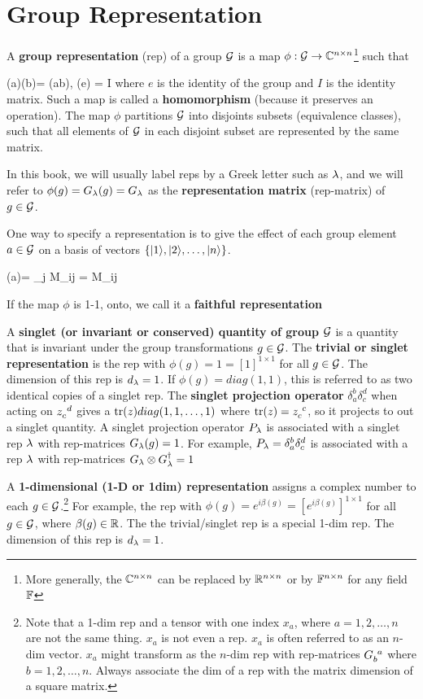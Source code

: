 \section{Group  Representation}

A {\bf group representation} (rep)
of a group ${\cal G}$
is a map $\phi: {\cal G}\rightarrow { \mathbb{C}}^{n\times n}$\footnote{More generally, the ${ \mathbb{C}}^{n\times n}$ can be replaced by ${ \mathbb{R}}^{n\times n}$ or by ${ \mathbb{F}}^{n\times n}$ for any field ${ \mathbb{F}}$} such that

\beq
\phi(a)\phi(b)=
\phi(ab),
\quad \phi(e) = I
\eeq
where $e$ is the
identity of the group
and $I$ 
is the identity matrix.
Such a map is called a {\bf homomorphism}
(because it preserves an operation).
The map $\phi$ 
partitions ${\cal G}$
into disjoints subsets (equivalence classes),
such that all elements of ${\cal G}$ in each disjoint subset 
are represented by the same matrix.

In this book, 
we will usually
label reps by a 
Greek letter
such as $\lambda$,
and we will refer to
$\phi(g)=G_\lambda(g)=G_\lambda$ as the
{\bf representation matrix} (rep-matrix) of $g\in{\cal G}$.

One  way to specify a representation is
to give the effect of each group element $a\in {\cal G}$ on a basis of vectors $\{|1\rangle, |2\rangle, \dots, |n\rangle\}$.


\beq
\phi (a)= \sum_j M_{ij}
\implies {} = M_{ij}
\eeq

If the map $\phi$
is 1-1, onto, we call it a {\bf faithful representation} 

A {\bf singlet (or invariant or conserved) quantity of group ${\cal G}$}
is a quantity that
is invariant under the group transformations
$g\in {\cal G}$.
The {\bf trivial or singlet representation}
is the rep with  $\phi(g)=1=[1]^{1\times 1}$ 
for all $g\in {\cal G}$.
The dimension 
of this rep is $d_\lambda=1$.
If $\phi(g)=diag(1,1)$,
this is referred to as two identical copies of a singlet rep.
The {\bf singlet projection operator}
$\delta_a^b \delta_c^d$
when acting on $z\indices{_c^d}$
gives a $ {\rm tr }(z) diag(1,1, \dots, 1)$
where $\tr(z)=z\indices{_c^c}$, so it
projects to out a singlet
quantity.
A singlet projection
operator $P_\lambda$ 
is associated with a singlet rep $\lambda$ with
rep-matrices $G_\lambda(g)=1$.
For example,
$P_\lambda=\delta_a^b \delta_c^d$
is associated with a rep $\lambda$
with rep-matrices
$G_\lambda\otimes G^\dagger_\lambda=1$




A {\bf 1-dimensional (1-D or 1dim) representation}
assigns a complex number to each
$g\in{\cal G}$.\footnote{Note that a 1-dim rep and
a tensor with one index $x_a$,
where $a=1, 2, \ldots, n$
are not the same thing. $x_a$ is
not even a rep. $x_a$ is often referred to
as an $n$-dim vector. $x_a$ might transform as
the $n$-dim rep with rep-matrices $G\indices{_b^a}$
where $b=1, 2, \ldots, n$. Always associate the dim of a rep
with the matrix dimension of a  square matrix.}
For example,
the rep with  $\phi(g)=e^{i\beta(g)}=[e^{i\beta(g)}]^{1\times 1}$
for all $g\in {\cal G}$,
where $\beta(g)\in { \mathbb{R}}$.
The the trivial/singlet rep
is a special 1-dim rep.
The dimension 
of this rep is $d_\lambda=1$.



